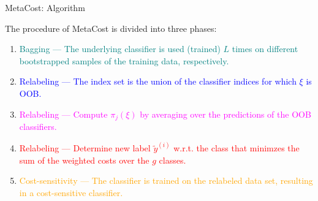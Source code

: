\documentclass[11pt,compress,t,notes=noshow, xcolor=table]{beamer}
\begin{document}
\begin{vbframe}{MetaCost: Algorithm}
	
	\scriptsize{
%		
 	The procedure of MetaCost is divided into three phases:
		\begin{minipage}{0.53\textwidth} 
%				
				\begin{enumerate}
%					
					\scriptsize
					\item \textcolor{teal}{Bagging --- The underlying classifier is used (trained) $L$ times on different bootstrapped samples of the training data, respectively.}
%					

     				\item \textcolor{blue}{Relabeling --- The index set is the union of the classifier indices for which $\xi$ is OOB.}

                        \item \textcolor{magenta}{ Relabeling --- Compute $\pi_j(\xi)$ by averaging over the predictions of the OOB classifiers.}

                        \item \textcolor{red}{ Relabeling --- Determine new label $\tilde y^{(i)}$ w.r.t. the class that minimzes the sum of the weighted costs over the $g$ classes.}
%					
					\item \textcolor{orange}{Cost-sensitivity ---  The classifier is trained on the relabeled data set, resulting in a cost-sensitive classifier.}
%					
				\end{enumerate}
%

%		
		
		\end{minipage}
		\begin{minipage}{0.45\textwidth} 
			\begin{algorithmic}
				

\end{algorithmic}
\end{minipage}}
\end{vbframe}
\end{document}
